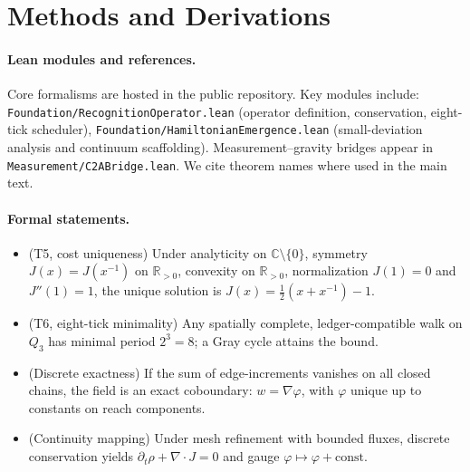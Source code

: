 \documentclass[aps,prx,twocolumn,superscriptaddress,nofootinbib]{revtex4-2}
\newcommand{\Jcost}{J}
\begin{document}
\appendix
\section{Methods and Derivations}\label{app:methods}
\paragraph*{Lean modules and references.} Core formalisms are hosted in the public repository. Key modules include: \texttt{Foundation/RecognitionOperator.lean} (operator definition, conservation, eight-tick scheduler), \texttt{Foundation/HamiltonianEmergence.lean} (small-deviation analysis and continuum scaffolding). Measurement--gravity bridges appear in \texttt{Measurement/C2ABridge.lean}. We cite theorem names where used in the main text.

\paragraph*{Formal statements.}
\begin{itemize}
  \item (T5, cost uniqueness) Under analyticity on \(\mathbb{C}\setminus\{0\}\), symmetry \(\Jcost(x)=\Jcost(x^{-1})\) on \(\mathbb{R}_{>0}\), convexity on \(\mathbb{R}_{>0}\), normalization \(\Jcost(1)=0\) and \(\Jcost''(1)=1\), the unique solution is \(\Jcost(x)=\tfrac12(x+x^{-1})-1\).
  \item (T6, eight-tick minimality) Any spatially complete, ledger-compatible walk on \(Q_3\) has minimal period \(2^3=8\); a Gray cycle attains the bound.
  \item (Discrete exactness) If the sum of edge-increments vanishes on all closed chains, the field is an exact coboundary: \(w=\nabla \varphi\), with \(\varphi\) unique up to constants on reach components.
  \item (Continuity mapping) Under mesh refinement with bounded fluxes, discrete conservation yields \(\partial_t\rho+\nabla\cdot J=0\) and gauge \(\varphi\mapsto\varphi+\mathrm{const}\).
\end{itemize}
\end{document}
